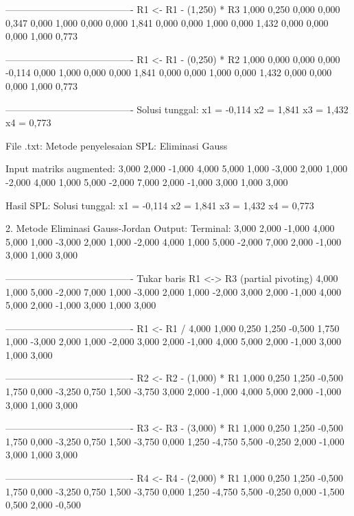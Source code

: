 \documentclass[12pt]{article}
\begin{document}
\begin{enumerate}
\begin{keluaran}
----------------------------------------
R1 <- R1 - (1,250) * R3
1,000   0,250   0,000   0,000   0,347
0,000   1,000   0,000   0,000   1,841
0,000   0,000   1,000   0,000   1,432
0,000   0,000   0,000   1,000   0,773

----------------------------------------
R1 <- R1 - (0,250) * R2
1,000   0,000   0,000   0,000   -0,114
0,000   1,000   0,000   0,000   1,841
0,000   0,000   1,000   0,000   1,432
0,000   0,000   0,000   1,000   0,773

----------------------------------------
Solusi tunggal:
x1 = -0,114
x2 = 1,841
x3 = 1,432
x4 = 0,773

File .txt:
Metode penyelesaian SPL: Eliminasi Gauss

Input matriks augmented:
3,000	2,000	-1,000	4,000	5,000
1,000	-3,000	2,000	1,000	-2,000
4,000	1,000	5,000	-2,000	7,000
2,000	-1,000	3,000	1,000	3,000

Hasil SPL:
Solusi tunggal:
x1 = -0,114
x2 = 1,841
x3 = 1,432
x4 = 0,773

2. Metode Eliminasi Gauss-Jordan
Output:
Terminal:
3,000   2,000   -1,000  4,000   5,000
1,000   -3,000  2,000   1,000   -2,000
4,000   1,000   5,000   -2,000  7,000
2,000   -1,000  3,000   1,000   3,000

----------------------------------------
Tukar baris R1 <-> R3 (partial pivoting)
4,000   1,000   5,000   -2,000  7,000
1,000   -3,000  2,000   1,000   -2,000
3,000   2,000   -1,000  4,000   5,000
2,000   -1,000  3,000   1,000   3,000

----------------------------------------
R1 <- R1 / 4,000
1,000   0,250   1,250   -0,500  1,750
1,000   -3,000  2,000   1,000   -2,000
3,000   2,000   -1,000  4,000   5,000
2,000   -1,000  3,000   1,000   3,000

----------------------------------------
R2 <- R2 - (1,000) * R1
1,000   0,250   1,250   -0,500  1,750
0,000   -3,250  0,750   1,500   -3,750
3,000   2,000   -1,000  4,000   5,000
2,000   -1,000  3,000   1,000   3,000

----------------------------------------
R3 <- R3 - (3,000) * R1
1,000   0,250   1,250   -0,500  1,750
0,000   -3,250  0,750   1,500   -3,750
0,000   1,250   -4,750  5,500   -0,250
2,000   -1,000  3,000   1,000   3,000

----------------------------------------
R4 <- R4 - (2,000) * R1
1,000   0,250   1,250   -0,500  1,750
0,000   -3,250  0,750   1,500   -3,750
0,000   1,250   -4,750  5,500   -0,250
0,000   -1,500  0,500   2,000   -0,500


\end{keluaran}
\end{enumerate}
\end{document}
